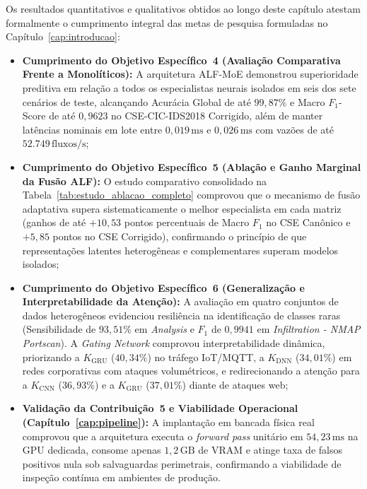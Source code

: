 Os resultados quantitativos e qualitativos obtidos ao longo deste capítulo atestam formalmente o
cumprimento integral das metas de pesquisa formuladas no Capítulo~\ref{cap:introducao}:
\begin{itemize}
    \item \textbf{Cumprimento do Objetivo Específico~4 (Avaliação Comparativa Frente a Monolíticos):}
    A arquitetura ALF-MoE demonstrou superioridade preditiva em relação a todos os especialistas neurais
    isolados em seis dos sete cenários de teste, alcançando Acurácia Global de até $99{,}87\%$ e Macro
    $F_1$-Score de até $0{,}9623$ no CSE-CIC-IDS2018 Corrigido, além de manter latências nominais em lote
    entre $0{,}019\,\mathrm{ms}$ e $0{,}026\,\mathrm{ms}$ com vazões de até
    $52.749\,\mathrm{fluxos/s}$;
    
    \item \textbf{Cumprimento do Objetivo Específico~5 (Ablação e Ganho Marginal da Fusão ALF):}
    O estudo comparativo consolidado na Tabela~\ref{tab:estudo_ablacao_completo} comprovou que o mecanismo
    de fusão adaptativa supera sistematicamente o melhor especialista em cada matriz (ganhos de até
    $+10{,}53$ pontos percentuais de Macro $F_1$ no CSE Canônico e $+5{,}85$ pontos no CSE Corrigido),
    confirmando o princípio de que representações latentes heterogêneas e complementares superam modelos
    isolados;
    
    \item \textbf{Cumprimento do Objetivo Específico~6 (Generalização e Interpretabilidade da Atenção):}
    A avaliação em quatro conjuntos de dados heterogêneos evidenciou resiliência na identificação de classes
    raras (Sensibilidade de $93{,}51\%$ em \emph{Analysis} e $F_1$ de $0{,}9941$ em
    \emph{Infiltration - NMAP Portscan}). A \emph{Gating Network} comprovou interpretabilidade dinâmica,
    priorizando a $K_{\mathrm{GRU}}$ ($40{,}34\%$) no tráfego IoT/MQTT, a
    $K_{\mathrm{DNN}}$ ($34{,}01\%$) em redes corporativas com ataques volumétricos, e
    redirecionando a atenção para a $K_{\mathrm{CNN}}$ ($36{,}93\%$) e a
    $K_{\mathrm{GRU}}$ ($37{,}01\%$) diante de ataques web;
    
    \item \textbf{Validação da Contribuição~5 e Viabilidade Operacional (Capítulo~\ref{cap:pipeline}):}
    A implantação em bancada física real comprovou que a arquitetura executa o \emph{forward pass} unitário
    em $54{,}23\,\mathrm{ms}$ na GPU dedicada, consome apenas $1{,}2\,\mathrm{GB}$ de VRAM e atinge taxa de
    falsos positivos nula sob salvaguardas perimetrais, confirmando a viabilidade de inspeção contínua em
    ambientes de produção.
\end{itemize}
